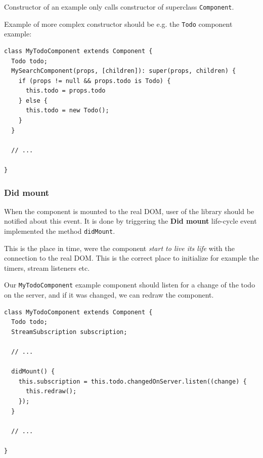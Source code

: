\documentclass[oneside, 12pt]{book}
\begin{document}
      Constructor of an example only calls constructor of superclass \texttt{Component}.

      Example of more complex constructor should be e.g. the \texttt{Todo} component example:
      \begin{verbatim}
class MyTodoComponent extends Component {
  Todo todo;
  MySearchComponent(props, [children]): super(props, children) {
    if (props != null && props.todo is Todo) {
      this.todo = props.todo
    } else {
      this.todo = new Todo();
    }
  }

  // ...

}
      \end{verbatim}



    \subsubsection{Did mount}\label{subsec:our-architecture-lifecycle-didmount}

      When the component is mounted to the real DOM, user of the library should be notified about this event. 
      It is done by triggering the \textbf{Did mount} life-cycle event implemented the method \texttt{didMount}. 

      This is the place in time, were the component \textit{start to live its life} with the connection to the real DOM.
      This is the correct place to initialize for example the timers, stream listeners etc. 

      Our \texttt{MyTodoComponent} example component should listen for a change of the todo on the server, 
      and if it was changed, we can redraw the component.
      \begin{verbatim}
class MyTodoComponent extends Component {
  Todo todo;
  StreamSubscription subscription;

  // ...

  didMount() {
    this.subscription = this.todo.changedOnServer.listen((change) {
      this.redraw();
    });
  }

  // ...

}
      \end{verbatim}

\end{document}
